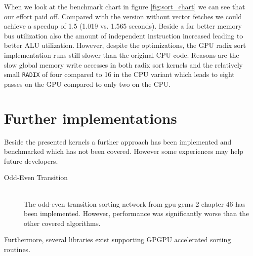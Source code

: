 When we look at the benchmark chart in figure \ref{fig:sort_chart} we can see that our effort paid off. Compared with the version without vector fetches we could achieve a speedup of 1.5 (1.019 vs. 1.565 seconds). Beside a far better memory bus utilization also the amount of independent instruction increased leading to better ALU utilization.
However, despite the optimizations, the GPU radix sort implementation runs still slower than the original CPU code. Reasons are the slow global memory write accesses in both radix sort kernels and the relatively small \lstinline!RADIX! of four compared to 16 in the CPU variant which leads to eight passes on the GPU compared to only two on the CPU.


\section{Further implementations}
Beside the presented kernels a further approach has been implemented and benchmarked which has not been covered. However some experiences may help future developers.

\begin{description}
	\item[Odd-Even Transition \cite{gpu_gems_2_chapter_46}] \hfill \\
	The odd-even transition sorting network from gpu gems 2 chapter 46 \cite{gpu_gems_2_chapter_46} has been implemented. However, performance was significantly worse than the other covered algorithms.
\end{description}

Furthermore, several libraries exist supporting GPGPU accelerated sorting routines.

